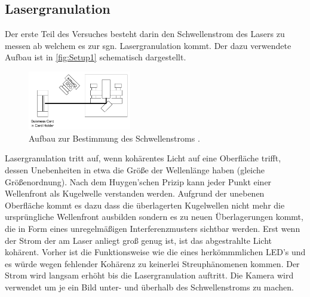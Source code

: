 \subsection{Lasergranulation}
\label{sec:AufbLasergran}
Der erste Teil des Versuches besteht darin den Schwellenstrom des Lasers zu messen ab welchem es zur sgn. Lasergranulation kommt.
Der dazu verwendete Aufbau ist in \autoref{fig:Setup1} schematisch dargestellt.
\begin{figure}
    \begin{center}
        \includegraphics[width=0.4\textwidth]{Setup1.pdf}
        \caption{Aufbau zur Bestimmung des Schwellenstroms \cite{ap60}.}
        \label{fig:Setup1}
    \end{center} 
\end{figure}
Lasergranulation tritt auf, wenn kohärentes Licht auf eine Oberfläche trifft, dessen Unebenheiten in etwa die Größe der Wellenlänge haben (gleiche Größenordnung).
Nach dem Huygen'schen Prizip kann jeder Punkt einer Wellenfront als Kugelwelle verstanden werden. Aufgrund der unebenen Oberfläche kommt es dazu dass die überlagerten Kugelwellen
nicht mehr die ursprüngliche Wellenfront ausbilden sondern es zu neuen Überlagerungen kommt, die in Form eines unregelmäßigen Interferenzmusters sichtbar werden.
Erst wenn der Strom der am Laser anliegt groß genug ist, ist das abgestrahlte Licht kohärent. Vorher ist die Funktionsweise wie die eines herkömmmlichen LED's und es würde wegen fehlender 
Kohärenz zu keinerlei Streuphänomenen kommen.
Der Strom wird langsam erhöht bis die Lasergranulation auftritt.
Die Kamera wird verwendet um je ein Bild unter- und überhalb des Schwellenstroms zu machen.


